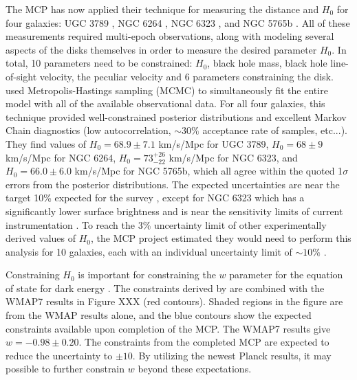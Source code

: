 The MCP has now applied their technique for measuring the distance and $H_0$ for four galaxies: UGC 3789 \citep{Braatz_2010,reid2013_mmproject_IV}, NGC 6264 \citep{Kuo_2013}, NGC 6323 \citep{kuo2015_mmproject_VI}, and NGC 5765b \citep{gao2015}. All of these measurements required multi-epoch observations, along with modeling several aspects of the disks themselves in order to measure the desired parameter $H_0$. In total, 10 parameters need to be constrained: $H_0$, black hole mass, black hole line-of-sight velocity, the peculiar velocity and 6 parameters constraining the disk. \citet{reid2013_mmproject_IV} used Metropolis-Hastings sampling (MCMC) to simultaneously fit the entire model with all of the available observational data. For all four galaxies, this technique provided well-constrained posterior distributions and excellent Markov Chain diagnostics (low autocorrelation, $\sim 30\%$ acceptance rate of samples, etc...). They find values of $H_0=68.9\pm7.1$ km/s/Mpc for UGC 3789, $H_0=68\pm9$ km/s/Mpc for NGC 6264, $H_0=73^{+26}_{-22}$ km/s/Mpc for NGC 6323, and $H_0=66.0\pm6.0$ km/s/Mpc for NGC 5765b, which all agree within the quoted 1$\sigma$ errors from the posterior distributions. The expected uncertainties are near the target 10\% expected for the survey \citep{reid2013_mmproject_IV}, except for NGC 6323 which has a significantly lower surface brightness and is near the sensitivity limits of current instrumentation \citep{kuo2015_mmproject_VI}. To reach the 3\% uncertainty limit of other experimentally derived values of $H_0$, the MCP project estimated they would need to perform this analysis for 10 galaxies, each with an individual uncertainty limit of $\sim 10\%$ \citep{reid2013_mmproject_IV}.  

Constraining $H_0$ is important for constraining the $w$ parameter for the equation of state for dark energy \citep{reid2013_mmproject_IV}. The constraints derived by \citet{reid2013_mmproject_IV} are combined with the WMAP7 results in Figure XXX (red contours). Shaded regions in the figure are from the WMAP results alone, and the blue contours show the expected constraints available upon completion of the MCP. The WMAP7 \citet{reid2013_mmproject_IV} results give $w=-0.98\pm0.20$. The constraints from the completed MCP are expected to reduce the uncertainty to $\pm10$. By utilizing the newest Planck results, it may possible to further constrain $w$ beyond these expectations.

